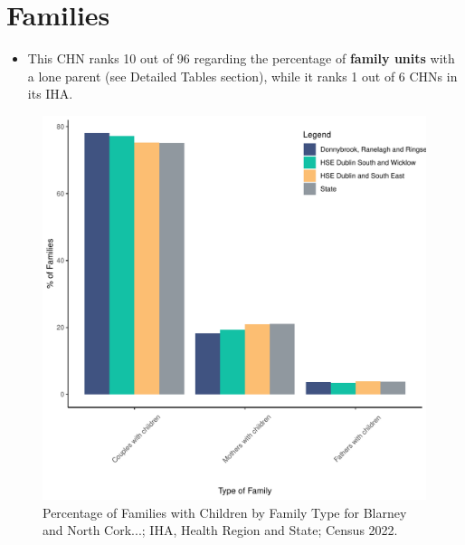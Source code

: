 \documentclass{article}
\begin{document}
\section{Families}\label{sect:Fam}
\begin{itemize}
\item This CHN ranks  10 out of 96 regarding the percentage of \textbf{family units} with a lone parent (see Detailed Tables section), while it ranks   1 out of 6 CHNs in its IHA.
\end{itemize}
\begin{figure}[H]
	\centering
	\includegraphics[width = 150mm]{../figures/FamED.pdf}
	\caption{Percentage of Families with Children by Family Type for Blarney and North Cork...; IHA, Health Region and State; Census 2022.}
	\label{fig:vbnv}
	\end{figure}
	
\end{document}
